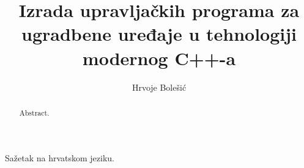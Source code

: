 \documentclass[times, utf8, diplomski]{fer}
\begin{document}

\title{Izrada upravljačkih programa za ugradbene uređaje u tehnologiji modernog C++-a}

\author{Hrvoje Bolešić}

\maketitle

\izvornik

\zahvala{}

\tableofcontents
















\begin{sazetak}
Sažetak na hrvatskom jeziku.

\end{sazetak}

\begin{abstract}
Abstract.

\end{abstract}
\end{document}
